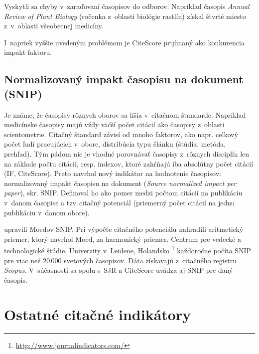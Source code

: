 Vyskytli sa chyby v~zaraďovaní časopisov do odborov. Napríklad časopis \emph{Annual
Review of Plant Biology} (ročenka z~oblasti biológie rastlín) získal štvrté miesto
z~v~oblasti všeobecnej medicíny.

I~napriek vyššie uvedeným problémom je CiteScore prijímaný ako konkurencia impakt faktoru.

\subsection{Normalizovaný impakt časopisu na dokument (SNIP)}
\label{sec:snip}

Je známe, že časopisy rôznych oborov sa líšia v~citačnom štandarde.  Napríklad
medicínske časopisy majú vždy väčší počet citácií ako časopisy z~oblasti
scientometrie. Citačný štandard závisí od mnoho faktorov, ako napr.  celkový
počet ľudí pracujúcich v~obore, distribúcia typu článku (štúdia, metóda,
prehľad).  Tým pádom nie je vhodné porovnávať časopisy z~rôznych disciplín len
na základe počtu citácií, resp. indexov, ktoré zahŕňajú iba absolútny počet
citácií (IF, CiteScore).  Preto \citet{Moed2010} navrhol nový indikátor na
hodnotenie časopisov: normalizovaný impakt časopisu na dokument (\emph{Source
normalized impact per paper}), skr. SNIP. Definoval ho ako pomer medzi počtom
citácií na publikáciu v~danom časopise a tzv.\,citačný potenciál (priemerný
počet citácií na jednu publikáciu v~danom obore).

\citet{Waltman2013} upravili Moedov SNIP. Pri výpočte citačného potenciálu
nahradili aritmetický priemer, ktorý navrhol Moed, za harmonický priemer.
Centrum pre vedecké a technologické štúdie, Univerzity v~Leidene, Holandsko
\footnote{\url{http://www.journalindicators.com/}} každoročne počíta SNIP pre
viac než 20\,000 svetových časopisov.  Dáta získavajú z~citačného registru
\emph{Scopus}. V~súčasnosti sa spolu s~SJR a CiteScore uvádza aj SNIP pre daný
časopis.

\section{Ostatné citačné indikátory}

